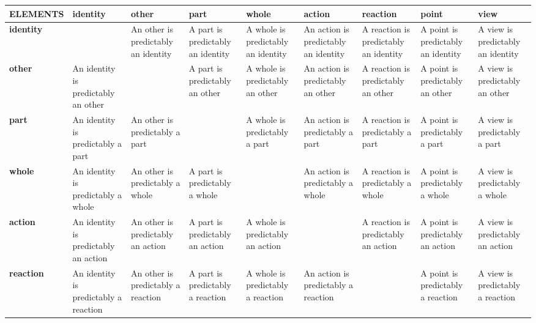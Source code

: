 \documentclass{tufte-handout}
\begin{document}
\begin{table}
\centering
\footnotesize
  \selectfont
\begin{tabular} {M{15mm}M{15mm} M{15mm}M{15mm}M{15mm}M{15mm}M{15mm}M{15mm}M{15mm}} \toprule

ELEMENTS &\textbf{identity} & \textbf{other} & \textbf{part} & \textbf{whole} & \textbf{action} & \textbf{reaction} & \textbf{point} & \textbf{view}\\\midrule
  
\textbf{identity} &  & An other is predictably an identity & A part is predictably an identity & A whole is predictably an identity & An action is predictably an identity & A reaction is predictably an identity & A point is predictably an identity & A view is predictably an identity\\

\textbf{other} & An identity is predictably an other &  & A part is predictably an other & A whole is predictably an other & An action is predictably an other & A reaction is predictably an other & A point is predictably an other & A view is predictably an other\\

\textbf{part} & An identity is predictably a part & An other is predictably a part   && A whole is predictably a part &  An action is predictably a part & A reaction is predictably a part & A point is predictably a part & A view is predictably a part\\
   
\textbf{whole} & An identity is predictably a whole & An other is predictably a whole & A part is predictably a whole &  & An action is predictably a whole & A reaction is predictably a whole & A point is predictably a whole & A view is predictably a whole\\

\textbf{action} & An identity is predictably an action & An other is predictably an action & A part is predictably an action & A whole is predictably an action &  & A reaction is predictably an action & A point is predictably an action & A view is predictably an action\\

\textbf{reaction} & An identity is predictably a reaction & An other is predictably a reaction & A part is predictably a reaction & A whole is predictably a reaction & An action is predictably a reaction &  & A point is predictably a reaction & A view is predictably a reaction\\
 

\end{tabular}
\end{table}
\end{document}
